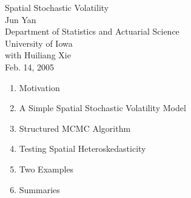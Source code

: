 \documentclass[semhelv,semcolor,11pt,slidesonly]{seminar}
\begin{document}
\begin{slide}\centerslidestrue
  \begin{center}
    {\Huge\blue Spatial Stochastic Volatility}\\[8ex]
    {\Large{Jun Yan}}\\[1.5ex]
    {\Large Department of Statistics and Actuarial Science}\\[1ex]
    {\Large University of Iowa}\\[4ex]
    {\Large with Huiliang Xie}\\[2ex]
    {\small Feb. 14, 2005}
  \end{center}
\end{slide}

\begin{slide}
  \begin{enumerate}
  \item Motivation
  \item A Simple Spatial Stochastic Volatility Model
  \item Structured MCMC Algorithm
  \item Testing Spatial Heteroskedasticity
  \item Two Examples
  \item Summaries
  \end{enumerate}
\end{slide}
\end{document}
